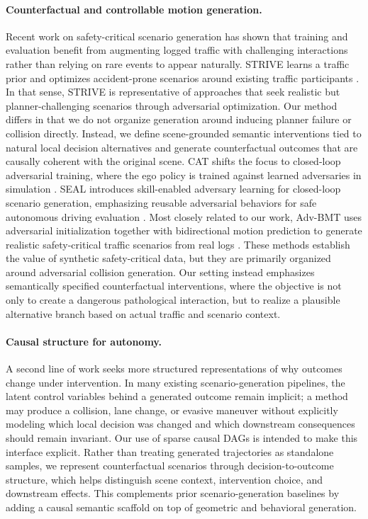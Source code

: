 \documentclass{article}
\begin{document}
\paragraph{Counterfactual and controllable motion generation.}
Recent work on safety-critical scenario generation has shown that training and evaluation benefit from augmenting logged traffic with challenging interactions rather than relying on rare events to appear naturally. STRIVE learns a traffic prior and optimizes accident-prone scenarios around existing traffic participants \citep{rempe2022strive}. In that sense, STRIVE is representative of approaches that seek realistic but planner-challenging scenarios through adversarial optimization. Our method differs in that we do not organize generation around inducing planner failure or collision directly. Instead, we define scene-grounded semantic interventions tied to natural local decision alternatives and generate counterfactual outcomes that are causally coherent with the original scene. CAT shifts the focus to closed-loop adversarial training, where the ego policy is trained against learned adversaries in simulation \citep{zhang2023cat}. SEAL introduces skill-enabled adversary learning for closed-loop scenario generation, emphasizing reusable adversarial behaviors for safe autonomous driving evaluation \citep{stoler2025seal}. Most closely related to our work, Adv-BMT uses adversarial initialization together with bidirectional motion prediction to generate realistic safety-critical traffic scenarios from real logs \citep{liu2025advbmt}. These methods establish the value of synthetic safety-critical data, but they are primarily organized around adversarial collision generation. Our setting instead emphasizes semantically specified counterfactual interventions, where the objective is not only to create a dangerous pathological interaction, but to realize a plausible alternative branch based on actual traffic and scenario context.

\paragraph{Causal structure for autonomy.}
A second line of work seeks more structured representations of why outcomes change under intervention. In many existing scenario-generation pipelines, the latent control variables behind a generated outcome remain implicit; a method may produce a collision, lane change, or evasive maneuver without explicitly modeling which local decision was changed and which downstream consequences should remain invariant. Our use of sparse causal DAGs is intended to make this interface explicit. Rather than treating generated trajectories as standalone samples, we represent counterfactual scenarios through decision-to-outcome structure, which helps distinguish scene context, intervention choice, and downstream effects. This complements prior scenario-generation baselines by adding a causal semantic scaffold on top of geometric and behavioral generation.
\end{document}
